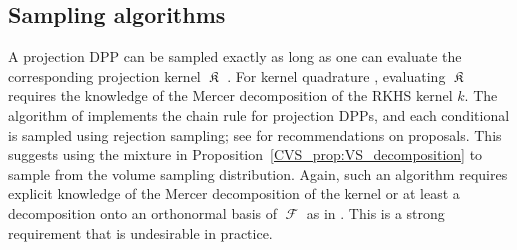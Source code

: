 \documentclass[twoside,11pt]{book}
\numberwithin{theorem}{chapter}
\numberwithin{definition}{chapter}
\numberwithin{proposition}{chapter}
\numberwithin{corollary}{chapter}
\numberwithin{example}{chapter}
\numberwithin{lemma}{chapter}
\numberwithin{assumption}{chapter}
\DeclareMathOperator*{\KDPP}{\mathfrak{K}}
\DeclareMathOperator{\F}{\mathcal{F}}
\begin{document}
\subsection{Sampling algorithms}


A projection DPP can be sampled exactly as long as one can evaluate the corresponding projection kernel $\KDPP$ \citep{HoKrPeVi06}. For kernel quadrature \citep{BeBaCh19}, evaluating $\KDPP$ requires the knowledge of the Mercer decomposition of the RKHS kernel $k$. The algorithm of \cite{HoKrPeVi06} implements the chain rule for projection DPPs, and each conditional is sampled using rejection sampling; see \cite{GaBaVa19} for recommendations on proposals. This suggests using the mixture in Proposition~\ref{CVS_prop:VS_decomposition} to sample from the volume sampling distribution.
Again, such an algorithm requires explicit knowledge of the Mercer decomposition of the kernel or at least a decomposition onto an orthonormal basis of $\F$ as in \citep{KaSaTa19}. This is a strong requirement that is undesirable in practice.
\end{document}
